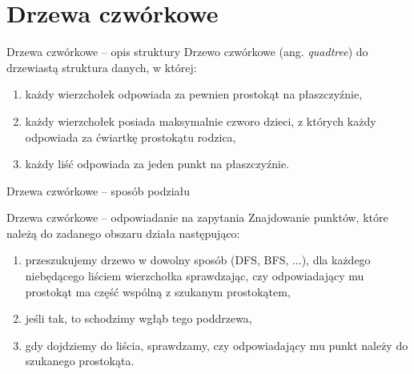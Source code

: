 \documentclass[aspectratio=169,dvipsnames]{beamer}
\begin{document}
\section{Drzewa czwórkowe}

\begin{frame}{Drzewa czwórkowe -- opis struktury}
    Drzewo czwórkowe (ang. \textit{quadtree}) do drzewiastą struktura danych, w której:
    \begin{enumerate}
        \item<2-> każdy wierzchołek odpowiada za pewnien prostokąt na płaszczyźnie,
        \item<3-> każdy wierzchołek posiada maksymalnie czworo dzieci, z których każdy odpowiada za ćwiartkę prostokątu rodzica,
        \item<4-> każdy liść odpowiada za jeden punkt na płaszczyźnie.
    \end{enumerate}
\end{frame}

\begin{frame}{Drzewa czwórkowe -- sposób podziału}
    
\end{frame}

\begin{frame}{Drzewa czwórkowe -- odpowiadanie na zapytania}
    Znajdowanie punktów, które należą do zadanego obszaru działa następująco:
    \begin{enumerate}
        \item<1-> przeszukujemy drzewo w dowolny sposób (DFS, BFS, ...), dla każdego niebędącego liściem wierzchołka sprawdzając, czy odpowiadający mu prostokąt ma część wspólną z szukanym prostokątem,
        \item<2-> jeśli tak, to schodzimy wgłąb tego poddrzewa,
        \item<3-> gdy dojdziemy do liścia, sprawdzamy, czy odpowiadający mu punkt należy do szukanego prostokąta.
    \end{enumerate}
\end{frame}
\end{document}
